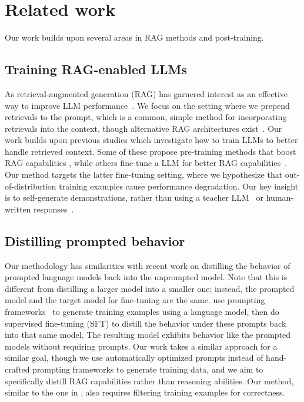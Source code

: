 \section{Related work}
Our work builds upon several areas in RAG methods and post-training.

\subsection{Training RAG-enabled LLMs}
As retrieval-augmented generation (RAG) has garnered interest as an effective way to improve LLM performance~\citep{Lewis2020RetrievalAugmentedGF}.
We focus on the setting where we prepend retrievals to the prompt, which is a common, simple method for incorporating retrievals into the context, 
though alternative RAG architectures exist~\citep[e.g.,][]{shi2023replug}. 
Our work builds upon previous studies which investigate how to train LLMs to better handle retrieved context.
Some of these propose pre-training methods that boost RAG capabilities
\citep{guu2020retrieval, Izacard2023AtlasFL, Shi2023InContextPL},
while others fine-tune a LLM for better RAG capabilities~\citet{luo-etal-2023-search}.
Our method targets the latter fine-tuning setting, where we hypothesize that out-of-distribution training examples cause performance degradation. 
Our key insight is to self-generate demonstrations, 
rather than using a teacher LLM~\citep{luo-etal-2023-search}
or human-written responses~\citep{lin2024radit}.

\subsection{Distilling prompted behavior}
Our methodology has similarities with recent work on distilling the behavior of prompted language models back into the unprompted model.
Note that this is different from distilling a larger model into a smaller one; instead, the prompted model and the target model for fine-tuning are the same.
\citet{Yu2024DistillingS2} use prompting frameworks~\citep[e.g., Chain-of-Thought, System 2 Attention;][]{wei2022chain, weston20232attentionisneed}
to generate training examples using a language model, 
then do supervised fine-tuning (SFT) to distill the behavior under these prompts back into that same model.
The resulting model exhibits behavior like the prompted models without requiring prompts. 
Our work takes a similar approach for a similar goal,
though we use automatically optimized prompts instead of hand-crafted prompting frameworks to generate training data,
and we aim to specifically distill RAG capabilities rather than reasoning abilities.
Our method, similar to the one in \citet{Yu2024DistillingS2},
also requires filtering training examples for correctness.

